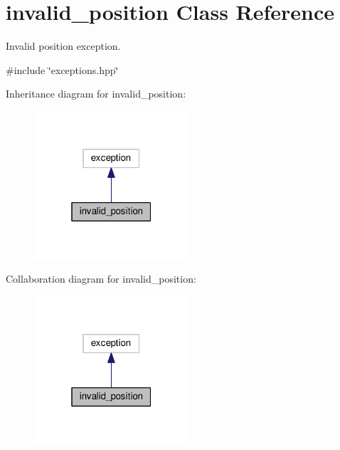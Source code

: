 \hypertarget{classinvalid__position}{}\section{invalid\+\_\+position Class Reference}
\label{classinvalid__position}


Invalid position exception.  




{\ttfamily \#include \char`\"{}exceptions.\+hpp\char`\"{}}



Inheritance diagram for invalid\+\_\+position\+:\nopagebreak
\begin{figure}[H]
\begin{center}
\leavevmode
\includegraphics[width=163pt]{classinvalid__position__inherit__graph}
\end{center}
\end{figure}


Collaboration diagram for invalid\+\_\+position\+:\nopagebreak
\begin{figure}[H]
\begin{center}
\leavevmode
\includegraphics[width=163pt]{classinvalid__position__coll__graph}
\end{center}
\end{figure}
